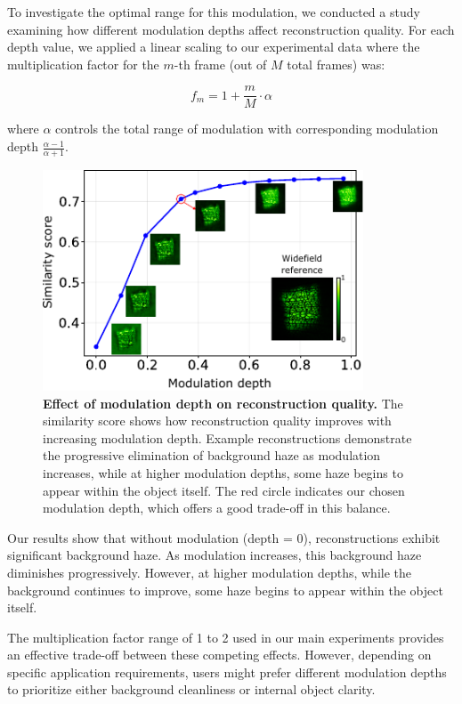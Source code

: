 \documentclass[pdflatex,sn-mathphys-num,Numbered]{sn-jnl}%
\theoremstyle{thmstyleone}%
\theoremstyle{thmstyletwo}%
\theoremstyle{thmstylethree}%
\begin{document}
To investigate the optimal range for this modulation, we conducted a study examining how different modulation depths affect reconstruction quality. For each depth value, we applied a linear scaling to our experimental data where the multiplication factor for the $m$-th frame (out of $M$ total frames) was:

\begin{equation}
    f_m = 1 + \frac{m}{M} \cdot \alpha
\end{equation}

where $\alpha$ controls the total range of modulation with corresponding modulation depth $\frac{\alpha-1}{\alpha+1}$.

\begin{figure}[htb!]
	\centering
	\includegraphics[width=0.85\textwidth]{supp_figures/Figure_S9.pdf}
    \caption{\textbf{Effect of modulation depth on reconstruction quality.} The similarity score shows how reconstruction quality improves with increasing modulation depth. Example reconstructions demonstrate the progressive elimination of background haze as modulation increases, while at higher modulation depths, some haze begins to appear within the object itself. The red circle indicates our chosen modulation depth, which offers a good trade-off in this balance.}
\end{figure}

Our results show that without modulation (depth = 0), reconstructions exhibit significant background haze. As modulation increases, this background haze diminishes progressively. However, at higher modulation depths, while the background continues to improve, some haze begins to appear within the object itself.

The multiplication factor range of 1 to 2 used in our main experiments provides an effective trade-off between these competing effects. However, depending on specific application requirements, users might prefer different modulation depths to prioritize either background cleanliness or internal object clarity.
\end{document}

